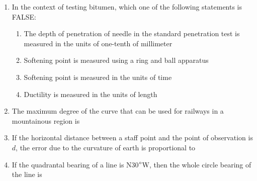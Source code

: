 \documentclass[journal,12pt,onecolumn]{article}
\theoremstyle{remark}
\begin{document}
\begin{enumerate}
\item In the context of testing bitumen, which one of the following statements is FALSE:

\hfill{}
\begin{enumerate}
    \item The depth of penetration of needle in the standard penetration test is measured in the units of one-tenth of millimeter
    \item Softening point is measured using a ring and ball apparatus
    \item Softening point is measured in the units of time
    \item Ductility is measured in the units of length
\end{enumerate}

\item The maximum degree of the curve that can be used for railways in a mountainous region is

\hfill{}
\begin{enumerate}
\end{enumerate}

\item If the horizontal distance between a staff point and the point of observation is $d$, the error due to the curvature of earth is proportional to

\hfill{}
\begin{enumerate}
\end{enumerate}

\item If the quadrantal bearing of a line is N30$\degree$W, then the whole circle bearing of the line is

\hfill{}
\begin{enumerate}
\end{enumerate}


\end{enumerate}
\end{document}
